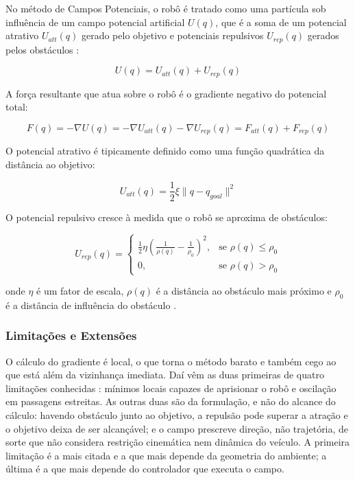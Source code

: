 No método de Campos Potenciais, o robô é tratado como uma partícula sob influência de um campo potencial artificial $U(q)$, que é a soma de um potencial atrativo $U_{att}(q)$ gerado pelo objetivo e potenciais repulsivos $U_{rep}(q)$ gerados pelos obstáculos \cite{Khatib1986, Siegwart2011}:

\begin{equation}
U(q) = U_{att}(q) + U_{rep}(q)
\end{equation}

A força resultante que atua sobre o robô é o gradiente negativo do potencial total:

\begin{equation}
F(q) = -\nabla U(q) = -\nabla U_{att}(q) - \nabla U_{rep}(q) = F_{att}(q) + F_{rep}(q)
\end{equation}

O potencial atrativo é tipicamente definido como uma função quadrática da distância ao objetivo:

\begin{equation}
U_{att}(q) = \frac{1}{2} \xi \|q - q_{goal}\|^2
\end{equation}

O potencial repulsivo cresce à medida que o robô se aproxima de obstáculos:

\begin{equation}
U_{rep}(q) = 
\begin{cases}
\frac{1}{2} \eta \left(\frac{1}{\rho(q)} - \frac{1}{\rho_0}\right)^2, & \text{se } \rho(q) \leq \rho_0 \\
0, & \text{se } \rho(q) > \rho_0
\end{cases}
\end{equation}

onde $\eta$ é um fator de escala, $\rho(q)$ é a distância ao obstáculo mais próximo e $\rho_0$ é a distância de influência do obstáculo \cite{Khatib1986, Siegwart2011}.

\subsubsection{Limitações e Extensões}

O cálculo do gradiente é local, o que torna o método barato e também cego ao que está
além da vizinhança imediata. Daí vêm as duas primeiras de quatro limitações conhecidas
\cite{Koren1991, Siegwart2011}: mínimos locais capazes de aprisionar o robô e oscilação em
passagens estreitas. As outras duas são da formulação, e não do alcance do cálculo:
havendo obstáculo junto ao objetivo, a repulsão pode superar a atração e o objetivo deixa
de ser alcançável; e o campo prescreve direção, não trajetória, de sorte que não considera
restrição cinemática nem dinâmica do veículo. A primeira limitação é a mais citada e a que
mais depende da geometria do ambiente; a última é a que mais depende do controlador que
executa o campo.

